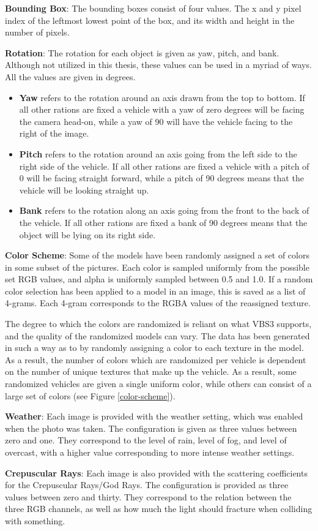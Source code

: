 \textbf{Bounding Box}: The bounding boxes consist of four values. The x and y pixel index of the leftmost lowest point of the box, and its width and height in the number of pixels.

\textbf{Rotation}: The rotation for each object is given as yaw, pitch, and bank. Although not utilized in this thesis, these values can be used in a myriad of ways. All the values are given in degrees. 

\begin{itemize}
    \item \textbf{Yaw} refers to the rotation around an axis drawn from the top to bottom. If all other rations are fixed a vehicle with a yaw of zero degrees will be facing the camera head-on, while a yaw of 90 will have the vehicle facing to the right of the image.

    \item \textbf{Pitch} refers to the rotation around an axis going from the left side to the right side of the vehicle. If all other rations are fixed a vehicle with a pitch of 0 will be facing straight forward, while a pitch of 90 degrees means that the vehicle will be looking straight up.

    \item \textbf{Bank} refers to the rotation along an axis going from the front to the back of the vehicle. If all other rations are fixed a bank of 90 degrees means that the object will be lying on its right side.
    
\end{itemize}

\textbf{Color Scheme}: Some of the models have been randomly assigned a set of colors in some subset of the pictures. Each color is sampled uniformly from the possible set RGB values, and alpha is uniformly sampled between 0.5 and 1.0. If a random color selection has been applied to a model in an image, this is saved as a list of 4-grams. Each 4-gram corresponds to the RGBA values of the reassigned texture. 

The degree to which the colors are randomized is reliant on what VBS3 supports, and the quality of the randomized models can vary. The data has been generated in such a way as to by randomly assigning a color to each texture in the model. As a result, the number of colors which are randomized per vehicle is dependent on the number of unique textures that make up the vehicle. As a result, some randomized vehicles are given a single uniform color, while others can consist of a large set of colors (see Figure \ref{color-scheme}).

\textbf{Weather}: Each image is provided with the weather setting, which was enabled when the photo was taken. The configuration is given as three values between zero and one. They correspond to the level of rain, level of fog, and level of overcast, with a higher value corresponding to more intense weather settings.

\textbf{Crepuscular Rays}: Each image is also provided with the scattering coefficients for the Crepuscular Rays/God Rays. The configuration is provided as three values between zero and thirty. They correspond to the relation between the three RGB channels, as well as how much the light should fracture when colliding with something.